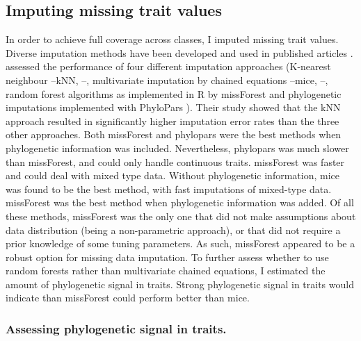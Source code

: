 \subsection{Imputing missing trait values}
In order to achieve full coverage across classes, I imputed missing trait values. Diverse imputation methods have been developed and used in published articles \citep{Cooke2019, Molina-Venegas2018, Swenson2014}. \citet{Penone2014} assessed the performance of four different imputation approaches (K-nearest neighbour --kNN, \citet{Troyanskaya2001}--, multivariate imputation by chained equations --mice, \citet{mice}--, random forest algorithms as implemented in R by missForest \citep{Stekhoven2012, Stekhoven2016} and phylogenetic imputations implemented with PhyloPars \citep{Bruggeman2009}). Their study showed that the kNN approach resulted in significantly higher imputation error rates than the three other approaches. Both missForest and phylopars were the best methods when phylogenetic information was included. Nevertheless, phylopars was much slower than missForest, and could only handle continuous traits. missForest was faster and could deal with mixed type data. Without phylogenetic information, mice was found to be the best method, with fast imputations of mixed-type data. missForest was the best method when phylogenetic information was added. Of all these methods, missForest was the only one that did not make assumptions about data distribution (being a non-parametric approach), or that did not require a prior knowledge of some tuning parameters. As such, missForest appeared to be a robust option for missing data imputation. To further assess whether to use random forests rather than multivariate chained equations, I estimated the amount of phylogenetic signal in traits. Strong phylogenetic signal in traits would indicate than missForest could perform better than mice.

\subsubsection{Assessing phylogenetic signal in traits.}

